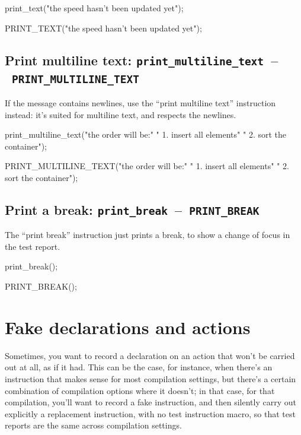 \documentclass[twoside, a4paper, article]{memoir}
\newcommand*\testudocolor{\color{red!80!blue}}
\newcommand*\testudo[1]{\texttt{\testudocolor{}#1}}
\newcommand*\testudopair[2]{\testudo{#1}~--~\testudo{#2}}
\begin{document}
\begin{cpplisting}
print_text("the speed hasn't been updated yet");
\end{cpplisting}

\begin{cpplisting}
PRINT_TEXT("the speed hasn't been updated yet");
\end{cpplisting}


\subsection{Print multiline text:
  \testudopair{print\_multiline\_text}{PRINT\_MULTILINE\_TEXT}}
\label{sec:print-multiline-text}

If the message contains newlines, use the ``print multiline text'' instruction
instead: it's suited for multiline text, and respects the newlines.

\begin{cpplisting}
print_multiline_text("the order will be:\n"
                     "  1. insert all elements\n"
                     "  2. sort the container");
\end{cpplisting}

\begin{cpplisting}
PRINT_MULTILINE_TEXT("the order will be:\n"
                     "  1. insert all elements\n"
                     "  2. sort the container");
\end{cpplisting}

\subsection{Print a break:
  \testudopair{print\_break}{PRINT\_BREAK}}
\label{sec:print-break}

The ``print break'' instruction just prints a break, to show a change of focus
in the test report.

\begin{cpplisting}
print_break();
\end{cpplisting}

\begin{cpplisting}
PRINT_BREAK();
\end{cpplisting}


\section{Fake declarations and actions}
\label{sec:fake-declarations-actions}

Sometimes, you want to record a declaration on an action that won't be carried
out at all, as if it had.  This can be the case, for instance, when there's an
instruction that makes sense for most compilation settings, but there's a
certain combination of compilation options where it doesn't; in that case, for
that compilation, you'll want to record a fake instruction, and then silently
carry out explicitly a replacement instruction, with no test instruction macro,
so that test reports are the same across compilation settings.
\end{document}
